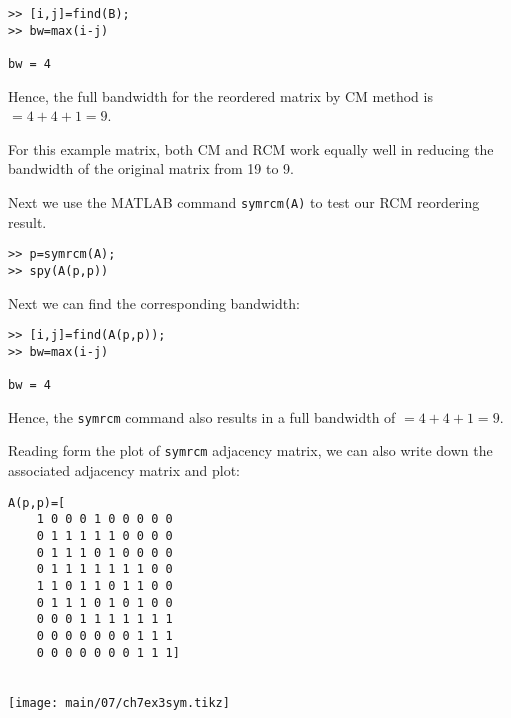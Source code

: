 \begin{enumerate}
\begin{minipage}[t]{0.49\linewidth}
        \begin{lstlisting}
>> [i,j]=find(B);
>> bw=max(i-j)

bw = 4
        \end{lstlisting}
    \end{minipage}
    \begin{minipage}[t]{0.5\linewidth}
        
    \end{minipage}

    Hence, the full bandwidth for the reordered matrix by CM method is
    $= 4 + 4 + 1 = 9$.

    For this example matrix, both CM and RCM work equally well in reducing the
    bandwidth of the original matrix from 19 to 9.

    \newpage
    Next we use the MATLAB command \texttt{symrcm(A)} to test our RCM reordering
    result.

    \begin{minipage}[t]{0.49\linewidth}
        \begin{lstlisting}
>> p=symrcm(A);
>> spy(A(p,p))
        \end{lstlisting}

        Next we can find the corresponding bandwidth:

        \begin{lstlisting}
>> [i,j]=find(A(p,p));
>> bw=max(i-j)

bw = 4
        \end{lstlisting}

        Hence, the \texttt{symrcm} command also results in a full bandwidth of
        $= 4 + 4 + 1 = 9$.
    \end{minipage}
    \begin{minipage}[t]{0.5\linewidth}
        
    \end{minipage}

    Reading form the plot of \texttt{symrcm} adjacency matrix, we can also write
    down the associated adjacency matrix and plot:

    \begin{minipage}[t]{0.49\linewidth}
        \begin{lstlisting}
A(p,p)=[
    1 0 0 0 1 0 0 0 0 0
    0 1 1 1 1 1 0 0 0 0
    0 1 1 1 0 1 0 0 0 0
    0 1 1 1 1 1 1 1 0 0
    1 1 0 1 1 0 1 1 0 0
    0 1 1 1 0 1 0 1 0 0
    0 0 0 1 1 1 1 1 1 1
    0 0 0 0 0 0 0 1 1 1
    0 0 0 0 0 0 0 1 1 1]
        \end{lstlisting}
    \end{minipage}
    \begin{minipage}[t]{0.5\linewidth}
        ~\\
        \texttt{[image: main/07/ch7ex3sym.tikz]}
    \end{minipage}


\end{enumerate}
